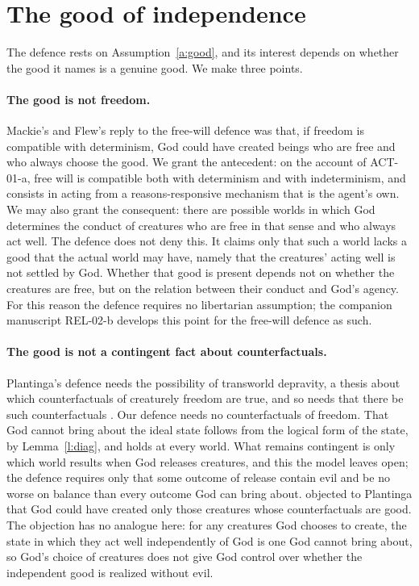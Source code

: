\documentclass{situationist-preprint}
\begin{document}
\section{The good of independence}\label{s:independence}

The defence rests on Assumption~\ref{a:good}, and its interest depends on whether the good it names is a genuine good. We make three points.

\paragraph{The good is not freedom.} Mackie's and Flew's reply to the free-will defence was that, if freedom is compatible with determinism, God could have created beings who are free and who always choose the good. We grant the antecedent: on the account of ACT-01-a, free will is compatible both with determinism and with indeterminism, and consists in acting from a reasons-responsive mechanism that is the agent's own. We may also grant the consequent: there are possible worlds in which God determines the conduct of creatures who are free in that sense and who always act well. The defence does not deny this. It claims only that such a world lacks a good that the actual world may have, namely that the creatures' acting well is not settled by God. Whether that good is present depends not on whether the creatures are free, but on the relation between their conduct and God's agency. For this reason the defence requires no libertarian assumption; the companion manuscript REL-02-b develops this point for the free-will defence as such.

\paragraph{The good is not a contingent fact about counterfactuals.} Plantinga's defence needs the possibility of transworld depravity, a thesis about which counterfactuals of creaturely freedom are true, and so needs that there be such counterfactuals \citep{Adams1977}. Our defence needs no counterfactuals of freedom. That God cannot bring about the ideal state follows from the logical form of the state, by Lemma~\ref{l:diag}, and holds at every world. What remains contingent is only which world results when God releases creatures, and this the model leaves open; the defence requires only that some outcome of release contain evil and be no worse on balance than every outcome God can bring about. \citet{Lewis1993} objected to Plantinga that God could have created only those creatures whose counterfactuals are good. The objection has no analogue here: for any creatures God chooses to create, the state in which they act well independently of God is one God cannot bring about, so God's choice of creatures does not give God control over whether the independent good is realized without evil.
\end{document}
